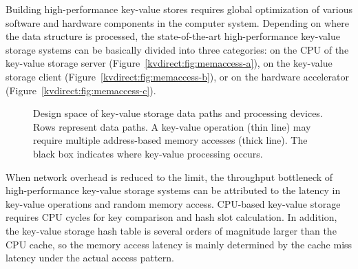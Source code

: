 Building high-performance key-value stores requires global optimization of various software and hardware components in the computer system. Depending on where the data structure is processed, the state-of-the-art high-performance key-value storage systems can be basically divided into three categories: on the CPU of the key-value storage server (Figure~\ref{kvdirect:fig:memaccess-a}), on the key-value storage client (Figure~\ref{kvdirect:fig:memaccess-b}), or on the hardware accelerator (Figure~\ref{kvdirect:fig:memaccess-c}).

\begin{figure*}[htbp]
	\centering
	\caption{Design space of key-value storage data paths and processing devices. Rows represent data paths. A key-value operation (thin line) may require multiple address-based memory accesses (thick line). The black box indicates where key-value processing occurs.}
	\label{kvdirect:fig:memaccess}
\end{figure*}

When network overhead is reduced to the limit, the throughput bottleneck of high-performance key-value storage systems can be attributed to the latency in key-value operations and random memory access. CPU-based key-value storage requires CPU cycles for key comparison and hash slot calculation. In addition, the key-value storage hash table is several orders of magnitude larger than the CPU cache, so the memory access latency is mainly determined by the cache miss latency under the actual access pattern.

